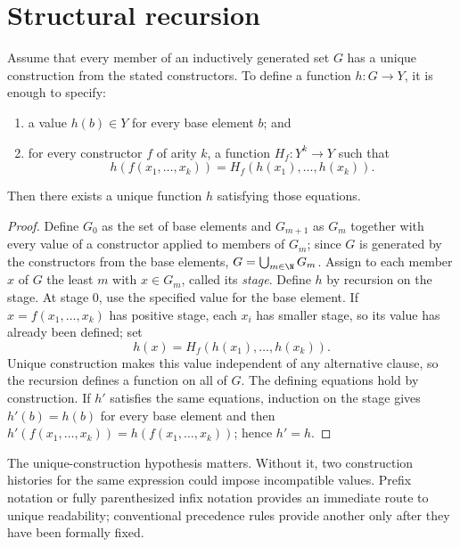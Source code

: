 \section{Structural recursion}
\label{sec:strings-03}

\begin{theorem}
Assume that every member of an inductively generated set \(G\) has a unique
construction from the stated constructors.  To define a function
\(h:G\to Y\), it is enough to specify:
\begin{enumerate}
  \item a value \(h(b)\in Y\) for every base element \(b\); and
  \item for every constructor \(f\) of arity \(k\), a function
        \(H_f:Y^k\to Y\) such that
        \[
          h(f(x_1,\ldots,x_k))
          =H_f(h(x_1),\ldots,h(x_k)).
        \]
\end{enumerate}
Then there exists a unique function \(h\) satisfying those equations.
\end{theorem}

\begin{proof}
Define \(G_0\) as the set of base elements and \(G_{m+1}\) as \(G_m\)
together with every value of a constructor applied to members of \(G_m\);
since \(G\) is generated by the constructors from the base elements,
\(G=\bigcup_{m\in\N}G_m\).  Assign to each member \(x\) of \(G\) the least
\(m\) with \(x\in G_m\), called its \emph{stage}.  Define \(h\) by
recursion on the stage.  At stage \(0\), use the specified
value for the base element.  If
\(x=f(x_1,\ldots,x_k)\) has positive stage, each \(x_i\) has smaller stage,
so its value has already been defined; set
\[
  h(x)=H_f(h(x_1),\ldots,h(x_k)).
\]
Unique construction makes this value independent of any alternative clause,
so the recursion defines a function on all of \(G\).  The defining equations
hold by construction.  If \(h'\) satisfies the same equations, induction on
the stage gives \(h'(b)=h(b)\) for every base element and then
\(h'(f(x_1,\ldots,x_k))=h(f(x_1,\ldots,x_k))\); hence \(h'=h\).
\end{proof}

The unique-construction hypothesis matters.  Without it, two construction
histories for the same expression could impose incompatible values.  Prefix
notation or fully parenthesized infix notation provides an immediate route to
unique readability; conventional precedence rules provide another only after
they have been formally fixed.

